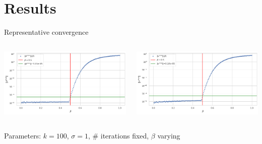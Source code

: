 \documentclass{beamer}
\begin{document}
\section{Results}
\begin{frame}{Representative convergence}
	\begin{minipage}[0.95\textheight]{\textwidth}
	\begin{columns}[T]
	\begin{column}{0.50\textwidth}
	\includegraphics[width=\textwidth, keepaspectratio]{../images/d_conv.png}
	\end{column}
	\begin{column}{0.50\textwidth}
	\includegraphics[width=\textwidth, keepaspectratio]{../images/v_conv.png}
	\end{column}
	\end{columns}
	\end{minipage}
	\begin{center}
		Parameters: $k=100$, $\sigma=1$, \# iterations fixed, $\beta$ varying
	\end{center}
\end{frame}
\end{document}
